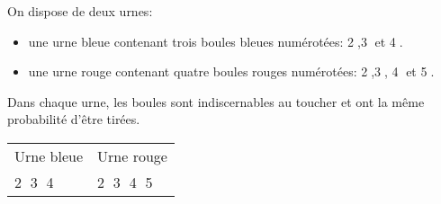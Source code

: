 \documentclass[10pt]{article}
\begin{document}
\setlength\parindent{0mm}
\pagestyle{fancy}
\thispagestyle{empty}
    
    
    




\medskip

On dispose de deux urnes:

\begin{itemize}
\item une urne bleue contenant trois boules bleues numérotées: \textcircled{2},\textcircled{3} et \textcircled{4}.
\item une urne rouge contenant quatre boules rouges numérotées: \textcircled{2},\textcircled{3}, \textcircled{4} et \textcircled{5}.
\end{itemize}

Dans chaque urne, les boules sont indiscernables au toucher et ont la même probabilité d'être tirées.

\begin{center}
\begin{tabularx}{\linewidth}{|*{2}{>{\centering \arraybackslash}X|}}\hline
Urne bleue &Urne rouge\\
\textcircled{2} \textcircled{3}  \textcircled{4}& \textcircled{2} \textcircled{3} \textcircled{4}  \textcircled{5}\\ \hline
\end{tabularx}
\end{center}
\medskip
\end{document}

